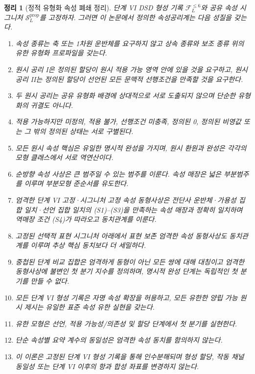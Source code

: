 \documentclass[11pt]{article}
\newcommand{\FVI}{\mathcal F_{L}^{\le 6}}
\newcommand{\Sprop}{\mathcal S_{L}^{\mathrm{prop}}}
\newtheorem{theorem}{정리}[section]
\theoremstyle{definition}
\theoremstyle{remark}
\begin{document}
\begin{theorem}[정적 유형화 속성 폐쇄 정리]
\label{thm:main}
단계 VI DSD 형성 기록 \(\FVI\)와 공유 속성 시그니처 \(\Sprop\)를 고정하자.
그러면 이 논문에서 정의한 속성공리계는 다음 성질을 갖는다.
\begin{enumerate}[label=(\arabic*)]
\item 속성 종류는 축 또는 1차원 운반체를 요구하지 않고 상속 종류와 보조 종류 위의 유한 유형화 프로파일을 갖는다.
\item 원시 공리 I은 정의된 할당이 원시 적용 가능 영역 안에 있을 것을 요구하고, 원시 공리 II는 정의된 할당이 선언된 모든 문맥적 선행조건을 만족할 것을 요구한다.
\item 두 원시 공리는 공유 유형화 배경에 상대적으로 서로 도출되지 않으며 단순한 유형화의 귀결도 아니다.
\item 적용 가능하지만 미정의, 적용 불가, 선행조건 미충족, 정의된 0, 정의된 비영값 또는 그 밖의 정의된 상태는 서로 구별된다.
\item 모든 원시 속성 핵심은 유일한 명시적 완성을 가지며, 원시 환원과 완성은 각각의 모형 클래스에서 서로 역연산이다.
\item 순방향 속성 사상은 큰 범주일 수 있는 범주를 이룬다. 속성 매장은 넓은 부분범주를 이루며 부분모형 준순서를 유도한다.
\item 엄격한 단계 VI 고정·시그니처 고정 속성 동형사상은 전단사 운반체·가용성 집합 일치·선언 집합 일치의 (S1)--(S3)을 만족하는 속성 매장과 정확히 일치하며 역매장 조건 (S4)가 따라오고 동치관계를 이룬다.
\item 고정된 선택적 표현 시그니처 아래에서 표현 보존 엄격한 속성 동형사상도 동치관계를 이루며 추상 핵심 동치보다 더 세밀하다.
\item 중첩된 단계 비교 집합은 엄격하게 동형이 아닌 모든 쌍에 대해 대칭이고 엄격한 동형사상에 불변인 첫 분기 지수를 정의하며, 명시적 완성 단계는 독립적인 첫 분기를 만들 수 없다.
\item 모든 단계 VI 형성 기록은 자명 속성 확장을 허용하고, 모든 유한한 양립 가능 원시 제시는 유일한 표준 속성 유한 실현을 갖는다.
\item 유한 모형은 선언, 적용 가능성/의존성 및 할당 단계에서 첫 분기를 실현한다.
\item 단순 속성별 요약 계수의 동일성은 엄격한 속성 동치를 함의하지 않는다.
\item 이 이론은 고정된 단계 VI 형성 기록을 통해 인수분해되며 형성 할당, 작동 채널 동일성 또는 단계 VI 이후의 항과 합성 좌표를 변경하지 않는다.
\end{enumerate}
\end{theorem}
\end{document}
